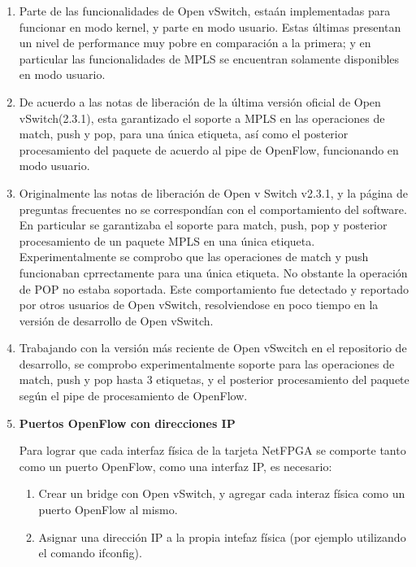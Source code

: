 \begin{enumerate}
\item Parte de las funcionalidades de Open vSwitch, esta\'an implementadas para funcionar en modo kernel, y parte en modo usuario. Estas \'ultimas presentan un nivel de performance muy pobre en comparaci\'on a la primera; y en particular las funcionalidades de MPLS se encuentran solamente disponibles en modo usuario.

\item De acuerdo a las notas de liberaci\'on de la \'ultima versi\'on oficial de Open vSwitch(2.3.1), 
esta garantizado el soporte a MPLS en las operaciones de match, push y pop, para una \'unica etiqueta, as\'i como el posterior procesamiento del paquete de acuerdo al pipe de OpenFlow, funcionando en modo usuario.

\item Originalmente las notas de liberaci\'on de Open v Switch v2.3.1, y la p\'agina de preguntas frecuentes no se correspond\'ian con el comportamiento del software. En particular se garantizaba el soporte para match, push, pop y posterior procesamiento de un paquete MPLS en una \'unica etiqueta.
Experimentalmente se comprobo que las operaciones de match y push funcionaban cprrectamente para una \'unica etiqueta. No obstante la operaci\'on de POP no estaba soportada. Este comportamiento fue detectado y reportado por otros usuarios de Open vSwitch, resolviendose en poco tiempo en la versi\'on de desarrollo de Open vSwitch.

\item Trabajando con la versi\'on m\'as reciente de Open vSwcitch en el repositorio de desarrollo, se comprobo experimentalmente soporte para las operaciones de match, push y pop hasta 3 etiquetas, y el posterior procesamiento del paquete seg\'un el pipe de procesamiento de OpenFlow.

\item \textbf{Puertos OpenFlow con direcciones IP}
 
Para lograr que cada interfaz f\'isica de la tarjeta NetFPGA se comporte tanto como un puerto OpenFlow, como una interfaz IP, es necesario:

\begin{enumerate}
\item Crear un bridge con Open vSwitch, y agregar cada interaz f\'isica como un puerto OpenFlow al mismo.
\item Asignar una direcci\'on IP a la propia intefaz f\'isica (por ejemplo utilizando el comando ifconfig).
\end{enumerate}


\end{enumerate}

